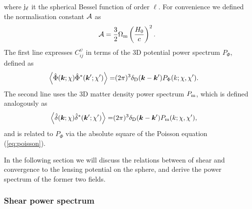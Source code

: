 \documentclass[fleqn,usenatbib]{mnras} %
\newcommand{\pref}{{\cal A}}
\renewcommand{\vec}{\bm}
\begin{document}
%
where ${\rm j}_\ell$ it the spherical Bessel function of order $\ell$. For
convenience we defined the normalisation constant $\pref$ as
%
\begin{equation}
  \pref = \frac 3 2 \Omega_{\rm m} \left(\frac{H_0} c\right)^2.
  \label{eq:pref}
\end{equation}
%
The first line expresses $C_{ij}^\psi$ in terms of the 3D potential power spectrum $P_\Phi$, defined as
%
\begin{align}
  \left\langle \hat \Phi(\vec k; \chi) \hat \Phi^\ast(\vec k^\prime; \chi^\prime) \right\rangle
    = & (2\pi)^3 \delta_{\rm D}(\vec k - \vec k^\prime) P_\Phi(k; \chi, \chi^\prime).
  \label{eq:p_phi}
\end{align}
%
The second line uses the 3D matter density power spectrum $P_{\rm m}$, which is defined analogously as
%
\begin{align}
  \left\langle \hat \delta(\vec k; \chi) \hat \delta^\ast(\vec k^\prime; \chi^\prime) \right\rangle
    = & (2\pi)^3 \delta_{\rm D}(\vec k - \vec k^\prime) P_{\rm m}(k; \chi, \chi^\prime),
  \label{eq:p_m}
\end{align}
%
and is
related to $P_\Phi$ via the absolute square of the Poisson equation (\ref{eq:poisson}).


In the following section we will discuss the relations between of shear and
convergence to the lensing potential on the sphere, and derive the power
spectrum of the former two fields.

\subsubsection{Shear power spectrum}
\end{document}
